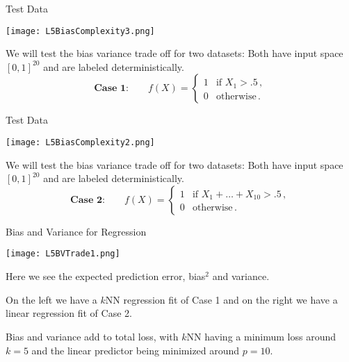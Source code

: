 \documentclass[10pt, table, dvipsnames,handout]{beamer}
\begin{document}
\begin{frame}[fragile]{Test Data}
  \begin{minipage}[t][0.5\textheight][t]{\textwidth}
	  \centering \texttt{[image: L5BiasComplexity3.png]}
  \end{minipage}
  \vfill
  \begin{minipage}[t][0.5\textheight][t]{\textwidth}
We will test the bias variance trade off for two datasets: Both have input space $[0,1]^{20}$ and are labeled deterministically.
$$
\textbf{Case 1:} \hspace{2em} f(X) = \begin{cases}
1&\text{if }X_1>.5\,,
\\
0&\text{otherwise}\,.
\end{cases}
$$
\end{minipage}
\end{frame}




\begin{frame}[fragile]{Test Data}
  \begin{minipage}[t][0.5\textheight][t]{\textwidth}
	  \centering \texttt{[image: L5BiasComplexity2.png]}
  \end{minipage}
  \vfill
  \begin{minipage}[t][0.5\textheight][t]{\textwidth}
We will test the bias variance trade off for two datasets: Both have input space $[0,1]^{20}$ and are labeled deterministically.
$$
\textbf{Case 2:} \hspace{2em} f(X) = \begin{cases}
1&\text{if }X_1+\ldots+X_{10}>.5\,,
\\
0&\text{otherwise}\,.
\end{cases}
$$
\end{minipage}
\end{frame}



\begin{frame}[fragile]{Bias and Variance for Regression}
  \begin{minipage}[t][0.5\textheight][t]{\textwidth}
	  \centering \texttt{[image: L5BVTrade1.png]}
  \end{minipage}
  \vfill
  \begin{minipage}[t][0.5\textheight][t]{\textwidth}
Here we see the {\color{orange}expected prediction error}, {\color{ForestGreen}bias$^2$} and {\color{SkyBlue}variance}.\newline

On the left we have a $k$NN regression fit of Case 1 and on the right we have a linear regression fit of Case 2.\pause\newline

Bias and variance add to total loss, with $k$NN having a minimum loss around $k=5$ and the linear predictor being minimized around $p=10$.
\end{minipage}
\end{frame}
\end{document}
